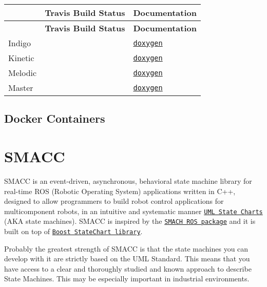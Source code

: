 \tabulinesep=1mm
\begin{longtabu} spread 0pt [c]{*3{|X[-1]}|}
\hline
{}&{\bf Travis Build Status }&{\bf Documentation  }\\
\endfirsthead
\hline
\endfoot
\hline
{}&{\bf Travis Build Status }&{\bf Documentation  }\\
\endhead
Indigo & &\href{https://reelrbtx.github.io/SMACC/indigo-devel/html/md_README.html}{\tt doxygen} \\
Kinetic & &\href{https://reelrbtx.github.io/SMACC/kinetic-devel/html/md_README.html}{\tt doxygen} \\
Melodic & &\href{https://reelrbtx.github.io/SMACC/melodic-devel/html/md_README.html}{\tt doxygen} \\
Master & &\href{https://reelrbtx.github.io/SMACC/master/html/md_README.html}{\tt doxygen} \\
\end{longtabu}


\subsection*{Docker Containers}

\href{https://hub.docker.com/r/pabloinigoblasco/smacc/}{\tt } \href{https://hub.docker.com/r/pabloinigoblasco/smacc/}{\tt } \href{https://registry.hub.docker.com/pabloinigoblasco/smacc/}{\tt }

\section*{S\+M\+A\+CC}

S\+M\+A\+CC is an event-\/driven, asynchronous, behavioral state machine library for real-\/time R\+OS (Robotic Operating System) applications written in C++, designed to allow programmers to build robot control applications for multicomponent robots, in an intuitive and systematic manner \href{http://sce.uhcl.edu/helm/rationalunifiedprocess/process/modguide/md_stadm.htm}{\tt U\+ML State Charts} (A\+KA state machines). S\+M\+A\+CC is inspired by the \href{http://wiki.ros.org/smach}{\tt S\+M\+A\+CH R\+OS package} and it is built on top of \href{https://www.boost.org/doc/libs/1_53_0/libs/statechart/doc/index.html}{\tt Boost State\+Chart library}.

Probably the greatest strength of S\+M\+A\+CC is that the state machines you can develop with it are strictly based on the U\+ML Standard. This means that you have access to a clear and thoroughly studied and known approach to describe State Machines. This may be especially important in industrial environments.

